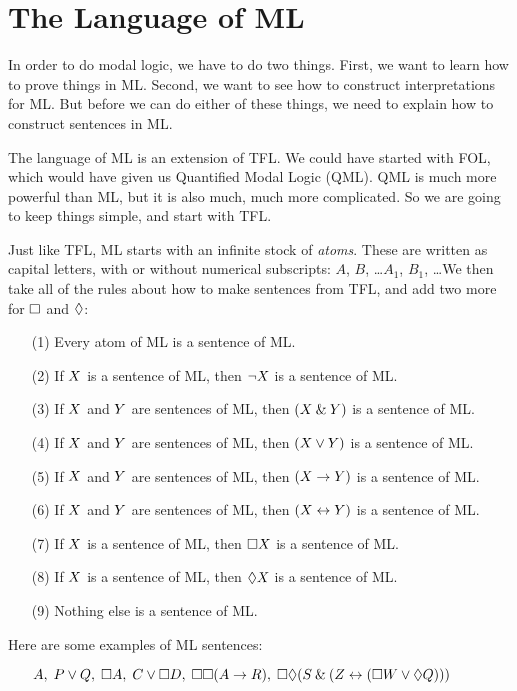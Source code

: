 \section{The Language of ML}
\label{TFLtoML}

In order to do modal logic, we have to do two things. First, we want to learn how to prove things in ML. Second, we want to see how to construct interpretations for ML. But before we can do either of these things, we need to explain how to construct sentences in ML.

The language of ML is an extension of TFL. We could have started with FOL, which would have given us Quantified Modal Logic (QML). QML is much more powerful than ML, but it is also much, much more complicated. So we are going to keep things simple, and start with TFL.

Just like TFL, ML starts with an infinite stock of \emph{atoms}. These are written as capital letters, with or without numerical subscripts: $A$, $B$, \dots  $A_1$, $B_1$, \dots  We then take all of the rules about how to make sentences from TFL, and add two more for $\Box$ and $\Diamond$:
\begin{itemize}
	\item[(1)]Every atom of ML is a sentence of ML.
	\item[(2)]If $X$ is a sentence of ML, then $\neg X$ is a sentence of ML.
	\item[(3)]If $X$ and $Y$ are sentences of ML, then $(X\mathbin{\&}Y)$ is a sentence of ML.
	\item[(4)]If $X$ and $Y$ are sentences of ML, then $(X\vee Y)$ is a sentence of ML.
	\item[(5)]If $X$ and $Y$ are sentences of ML, then $(X\rightarrow Y)$ is a sentence of ML.
	\item[(6)]If $X$ and $Y$ are sentences of ML, then $(X\leftrightarrow Y)$ is a sentence of ML.
	\item[(7)]If $X$ is a sentence of ML, then $\Box X$ is a sentence of ML.
	\item[(8)]If $X$ is a sentence of ML, then $\Diamond X$ is a sentence of ML.
	\item[(9)]Nothing else is a sentence of ML.
\end{itemize}
Here are some examples of ML sentences:
\begin{itemize}
	\item[]$A,\;P\vee Q,\;\Box A,\;C\vee \Box D,\;\Box\Box (A\rightarrow R),\;\Box\Diamond (S\mathbin{\&} (Z\leftrightarrow (\Box W \vee \Diamond Q)))$
\end{itemize}

